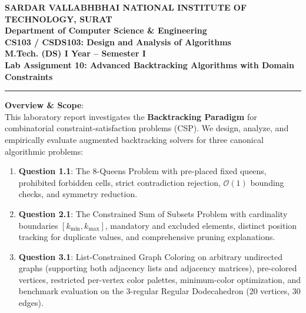 \documentclass[12pt]{article}
\begin{document}
\begin{center}
\textbf{\Large SARDAR VALLABHBHAI NATIONAL INSTITUTE OF TECHNOLOGY, SURAT}\\[4pt]
\textbf{\large Department of Computer Science \& Engineering}\\[3pt]
\textbf{\large CS103 / CSDS103: Design and Analysis of Algorithms}\\[3pt]
\textbf{\large M.Tech. (DS) I Year -- Semester I}\\[4pt]
\textbf{\Large Lab Assignment 10: Advanced Backtracking Algorithms with Domain Constraints}
\end{center}

\vspace{0.2cm}
\hrule
\vspace{0.4cm}

\textbf{Overview \& Scope}:\\
This laboratory report investigates the \textbf{Backtracking Paradigm} for combinatorial constraint-satisfaction problems (CSP). We design, analyze, and empirically evaluate augmented backtracking solvers for three canonical algorithmic problems:
\begin{enumerate}
    \item \textbf{Question 1.1}: The $8$-Queens Problem with pre-placed fixed queens, prohibited forbidden cells, strict contradiction rejection, $\mathcal{O}(1)$ bounding checks, and symmetry reduction.
    \item \textbf{Question 2.1}: The Constrained Sum of Subsets Problem with cardinality boundaries $[k_{\min}, k_{\max}]$, mandatory and excluded elements, distinct position tracking for duplicate values, and comprehensive pruning explanations.
    \item \textbf{Question 3.1}: List-Constrained Graph Coloring on arbitrary undirected graphs (supporting both adjacency lists and adjacency matrices), pre-colored vertices, restricted per-vertex color palettes, minimum-color optimization, and benchmark evaluation on the 3-regular Regular Dodecahedron (20 vertices, 30 edges).
\end{enumerate}

\vspace{0.3cm}

\end{document}

